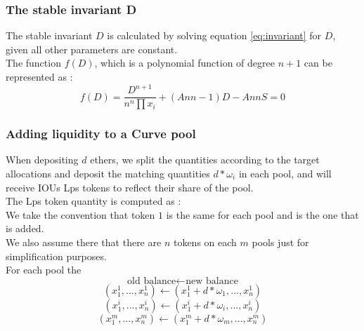 \documentclass[conference]{IEEEtran}
\begin{document}
\subsubsection{The stable invariant D}
The stable invariant $D$ is calculated by solving equation \ref{eq:invariant} for $D$, given all other parameters are constant.\\
The function $f(D)$, which is a polynomial function of degree $n+1$ can be represented as :
\begin{equation}\label{eq:invariantNewton}
f(D) = \frac{D^{n+1}}{n^n \prod x_i} + (Ann-1)D-Ann S=0
\end{equation}
\subsubsection{Adding liquidity to a Curve pool}\label{add}
When depositing $d$ ethers, we split the quantities according to the target allocations and deposit the matching quantities $d*\omega_i$ in each pool, and will receive IOUs Lps tokens to reflect their share of the pool.\\
The Lps token quantity is computed as :\\
We take the convention that token $1$ is the same for each pool and is the one that is added.\\
We also assume there that there are $n$ tokens on each $m$ pools just for simplification purposes.\\
For each pool the 
$$
\text{old balance} \leftarrow  \text{new balance}
$$
$$
(x_1^1,...,x_n^1) \leftarrow  (x_1^1 + d*\omega_1,...,x_n^1)
$$
$$
(x_1^i,...,x_n^i) \leftarrow  (x_1^i + d*\omega_i,...,x_n^i)
$$
$$
(x_1^m,...,x_n^m) \leftarrow  (x_1^m + d*\omega_m,...,x_n^m)
$$
\end{document}
